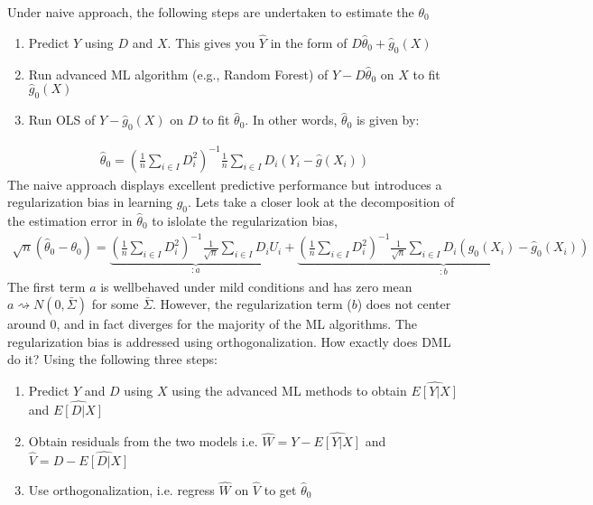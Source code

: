 \documentclass[letterpaper,10pt,english]{jupyterBook}
\begin{document}
\sphinxAtStartPar
Under naive approach, the following steps are undertaken to estimate the \(\theta_0\)
\begin{enumerate}
%
\item {} 
\sphinxAtStartPar
Predict \(Y\) using \(D\) and \(X\). This gives you \(\hat Y\) in the form of \(D\hat\theta_0 + \hat g_0(X)\)

\item {} 
\sphinxAtStartPar
Run advanced ML algorithm (e.g., Random Forest) of \(Y - D\hat\theta_0\) on \(X\) to fit \(\hat g_0(X)\)

\item {} 
\sphinxAtStartPar
Run OLS of \(Y - \hat g_0(X)\) on \(D\) to fit \(\hat\theta_0\). In other words, \(\hat\theta_0\) is given by:

\end{enumerate}
\begin{equation*}
\begin{split} \hat\theta_0 = \left( \frac{1}{n} \sum_{i \in I} D_i^2 \right)^{-1} \frac{1}{n} \sum_{i \in I}D_i(Y_i - \hat g(X_i)) \end{split}
\end{equation*}
\sphinxAtStartPar
The naive approach displays excellent predictive performance but introduces a regularization bias in learning \(g_0\). Lets take a closer look at the decomposition of the estimation error in \(\hat\theta_0\) to islolate the regularization bias,
\begin{equation*}
\begin{split}\sqrt{n}(\hat\theta_0 - \theta_0) = \underbrace{\left( \frac{1}{n} \sum_{i \in I} D_i^2 \right)^{-1} \frac{1}{\sqrt{n}} \sum_{i \in I} D_i U_i}_{:a} + \underbrace{\left( \frac{1}{n} \sum_{i \in I} D_i^2 \right)^{-1} \frac{1}{\sqrt{n}} \sum_{i \in I} D_i(g_0(X_i) - \hat g_0(X_i))}_{:b}\end{split}
\end{equation*}
\sphinxAtStartPar
The first term \(a\) is well\sphinxhyphen{}behaved under mild conditions and has zero mean \(a \rightsquigarrow N(0, \bar\Sigma)\) for some \(\bar\Sigma\). However, the regularization term (\(b\)) does not center around 0, and in fact diverges for the majority of the ML algorithms. The regularization bias is addressed using orthogonalization. How exactly does DML do it? Using the following three steps:
\begin{enumerate}
%
\item {} 
\sphinxAtStartPar
Predict \(Y\) and \(D\) using \(X\) using the advanced ML methods to obtain \(\widehat{E[Y|X]}\) and \(\widehat{E[D|X]}\)

\item {} 
\sphinxAtStartPar
Obtain residuals from the two models i.e. \(\widehat{W} = Y -\widehat{E[Y|X]}\) and \(\widehat{V} = D -\widehat{E[D|X]}\)

\item {} 
\sphinxAtStartPar
Use orthogonalization, i.e. regress \(\widehat{W}\) on \(\widehat{V}\) to get \(\hat\theta_0\)

\end{enumerate}
\end{document}

